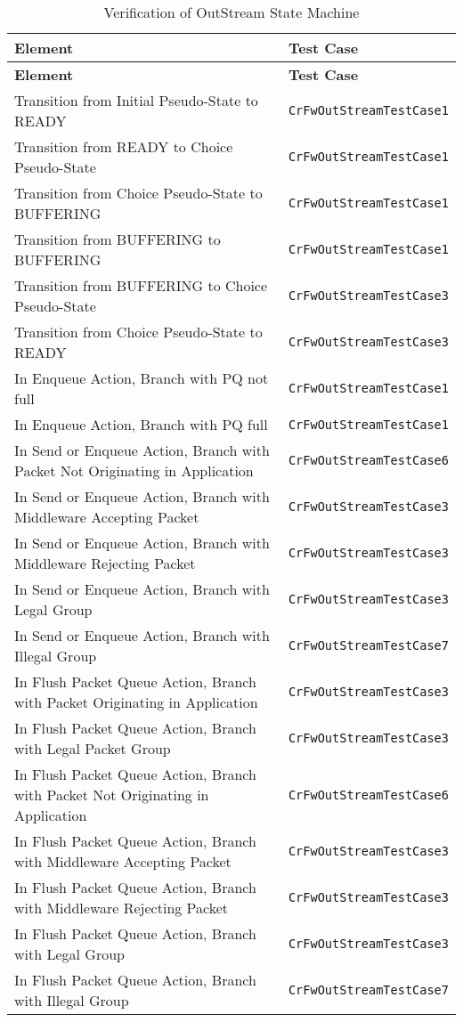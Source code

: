 \documentclass{pnp_article}
\begin{document}
\begin{longtable}{|>{\raggedright}p{8.0cm}|P{5.0cm}|}
\caption{Verification of OutStream State Machine}
\label{tab:verOutStreamSM}\\
\hline
{}
\textbf{Element} & \textbf{Test Case} \\
\hline
\endfirsthead
{}
\textbf{Element} & \textbf{Test Case} \\
\hline
\endhead
Transition from Initial Pseudo-State to READY  & \texttt{CrFwOutStreamTestCase1}\\
\hline
Transition from READY to Choice Pseudo-State & \texttt{CrFwOutStreamTestCase1}\\
\hline
Transition from Choice Pseudo-State to BUFFERING & \texttt{CrFwOutStreamTestCase1}\\
\hline
Transition from BUFFERING to BUFFERING & \texttt{CrFwOutStreamTestCase1}\\
\hline
Transition from BUFFERING to Choice Pseudo-State & \texttt{CrFwOutStreamTestCase3}\\
\hline
Transition from Choice Pseudo-State to READY & \texttt{CrFwOutStreamTestCase3}\\
\hline
In Enqueue Action, Branch with PQ not full & \texttt{CrFwOutStreamTestCase1}\\
\hline
In Enqueue Action, Branch with PQ full & \texttt{CrFwOutStreamTestCase1}\\
\hline
In Send or Enqueue Action, Branch with Packet Not Originating in Application & \texttt{CrFwOutStreamTestCase6}\\
\hline
In Send or Enqueue Action, Branch with Middleware Accepting Packet & \texttt{CrFwOutStreamTestCase3}\\
\hline
In Send or Enqueue Action, Branch with Middleware Rejecting Packet & \texttt{CrFwOutStreamTestCase3}\\
\hline
In Send or Enqueue Action, Branch with Legal Group & \texttt{CrFwOutStreamTestCase3}\\
\hline
In Send or Enqueue Action, Branch with Illegal Group & \texttt{CrFwOutStreamTestCase7}\\
\hline
In Flush Packet Queue Action, Branch with Packet Originating in Application & \texttt{CrFwOutStreamTestCase3}\\
\hline
In Flush Packet Queue Action, Branch with Legal Packet Group & \texttt{CrFwOutStreamTestCase3}\\
\hline
In Flush Packet Queue Action, Branch with Packet Not Originating in Application & \texttt{CrFwOutStreamTestCase6}\\
\hline
In Flush Packet Queue Action, Branch with Middleware Accepting Packet & \texttt{CrFwOutStreamTestCase3}\\
\hline
In Flush Packet Queue Action, Branch with Middleware Rejecting Packet & \texttt{CrFwOutStreamTestCase3}\\
\hline
In Flush Packet Queue Action, Branch with Legal Group & \texttt{CrFwOutStreamTestCase3}\\
\hline
In Flush Packet Queue Action, Branch with Illegal Group & \texttt{CrFwOutStreamTestCase7}\\
\hline
\end{longtable}
\end{document}

